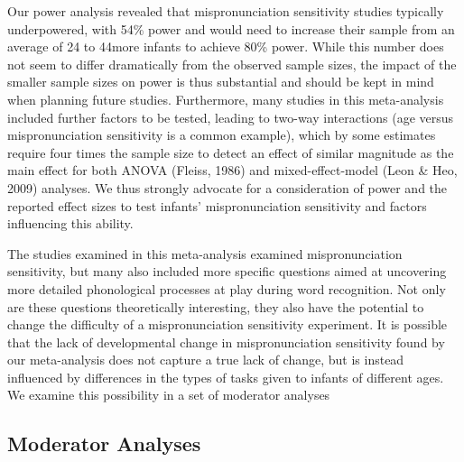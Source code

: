 \documentclass[
  man, noextraspace]{apa6}
\begin{document}
Our power analysis revealed that mispronunciation sensitivity studies typically underpowered, with 54\% power and would need to increase their sample from an average of 24 to 44more infants to achieve 80\% power. While this number does not seem to differ dramatically from the observed sample sizes, the impact of the smaller sample sizes on power is thus substantial and should be kept in mind when planning future studies. Furthermore, many studies in this meta-analysis included further factors to be tested, leading to two-way interactions (age versus mispronunciation sensitivity is a common example), which by some estimates require four times the sample size to detect an effect of similar magnitude as the main effect for both ANOVA (Fleiss, 1986) and mixed-effect-model (Leon \& Heo, 2009) analyses. We thus strongly advocate for a consideration of power and the reported effect sizes to test infants' mispronunciation sensitivity and factors influencing this ability.

The studies examined in this meta-analysis examined mispronunciation sensitivity, but many also included more specific questions aimed at uncovering more detailed phonological processes at play during word recognition. Not only are these questions theoretically interesting, they also have the potential to change the difficulty of a mispronunciation sensitivity experiment. It is possible that the lack of developmental change in mispronunciation sensitivity found by our meta-analysis does not capture a true lack of change, but is instead influenced by differences in the types of tasks given to infants of different ages. We examine this possibility in a set of moderator analyses

\hypertarget{moderator-analyses}{%
\subsection{Moderator Analyses}\label{moderator-analyses}}
\end{document}
